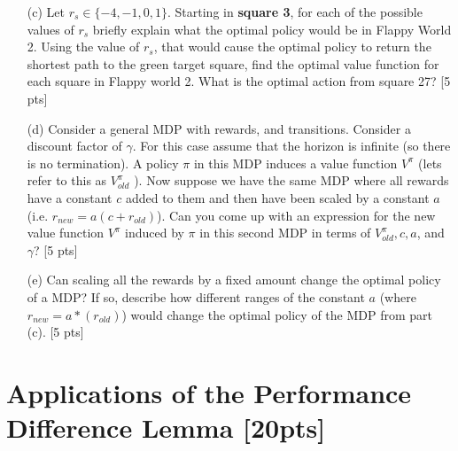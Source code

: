 \documentclass[11pt]{article}
\begin{document}
\begin{enumerate}

\item[(c)] Let $r_s \in \{-4,-1,0,1\}$. Starting in \textbf{square 3}, for each of the possible values of $r_s$ briefly explain what the optimal policy would be in Flappy World 2. Using the value of $r_s$, that would cause the optimal policy to return the shortest path to the green target square, find the optimal value function for each square in Flappy world 2. What is the optimal action from square 27? [5 pts]


\item[(d)] Consider a general MDP with rewards, and transitions. Consider a discount factor of $\gamma$. For this case assume that the horizon is infinite (so there is no termination). A policy $\pi$ in
this MDP induces a value function $V^{\pi}$ (lets refer to this as $V^{\pi}_{old}$ ). Now suppose we have the same MDP where all rewards have a constant $c$ added to them and then have been scaled by a constant $a$ (i.e. $r_{new} = a(c+ r_{old})$). Can you come up with an expression for the new value function $V^{\pi}$ induced by $\pi$ in this second MDP in terms of $V^{\pi}_{old}, c, a$, and $\gamma$? [5 pts]

\item[(e)] Can scaling all the rewards by a fixed amount change the optimal policy of a MDP? If so, describe how different ranges of the constant $a$ (where $r_{new} = a*(r_{old})$) would change the optimal policy of the MDP from part (c). [5 pts]
 

\end{enumerate}


\begin{tcolorbox}[breakable]



\end{tcolorbox}

\newpage

\section{Applications of the Performance Difference Lemma [20pts]}
\end{document}
